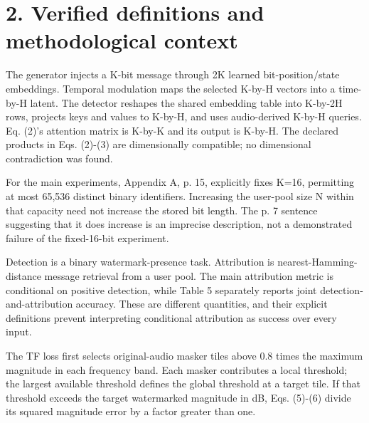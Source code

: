 \documentclass[10pt]{article}
\begin{document}
\section*{2. Verified definitions and methodological context}
The generator injects a K-bit message through 2K learned bit-position/state embeddings. Temporal modulation maps the selected K-by-H vectors into a time-by-H latent. The detector reshapes the shared embedding table into K-by-2H rows, projects keys and values to K-by-H, and uses audio-derived K-by-H queries. Eq. (2)’s attention matrix is K-by-K and its output is K-by-H. The declared products in Eqs. (2)-(3) are dimensionally compatible; no dimensional contradiction was found.\par
For the main experiments, Appendix A, p. 15, explicitly fixes K=16, permitting at most 65,536 distinct binary identifiers. Increasing the user-pool size N within that capacity need not increase the stored bit length. The p. 7 sentence suggesting that it does increase is an imprecise description, not a demonstrated failure of the fixed-16-bit experiment.\par
Detection is a binary watermark-presence task. Attribution is nearest-Hamming-distance message retrieval from a user pool. The main attribution metric is conditional on positive detection, while Table 5 separately reports joint detection-and-attribution accuracy. These are different quantities, and their explicit definitions prevent interpreting conditional attribution as success over every input.\par
The TF loss first selects original-audio masker tiles above 0.8 times the maximum magnitude in each frequency band. Each masker contributes a local threshold; the largest available threshold defines the global threshold at a target tile. If that threshold exceeds the target watermarked magnitude in dB, Eqs. (5)-(6) divide its squared magnitude error by a factor greater than one.\par
\end{document}
